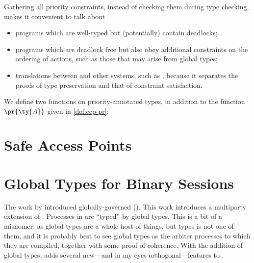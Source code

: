 \documentclass{article}
\begin{document}
Gathering all priority constraints, instead of checking them during type
checking, makes it convenient to talk about
\begin{itemize}
\item 
  programs which are well-typed but (potentially) contain deadlocks;
\item
  programs which are deadlock free but also obey additional constraints on the
  ordering of actions, such as those that may arise from global types; 
\item
  translations between \ccp and other systems, such as \cp, because it separates
  the proofs of type preservation and that of constraint satisfaction.
\end{itemize}
We define two functions on priority-annotated types, in addition to the function
$\pr{\ty{A}}$ given in \cref{def:ccp-pr}:




\section{Safe Access Points}






\section{Global Types for Binary Sessions}\label{sec:globaltypes}
The work by \textcite{carbone2016} introduced globally-governed \cp (\gcp).
This work introduces a multiparty extension of \cp.
Processes in \gcp are ``typed'' by global types.
This is a bit of a misnomer, as global types are a whole host of things, but
types is not one of them, and it is probably best to see global types as the
arbiter processes to which they are compiled, together with some proof of
coherence.
With the addition of global types, \gcp adds several new---and in my eyes
orthogonal---features to \cp.
\end{document}
